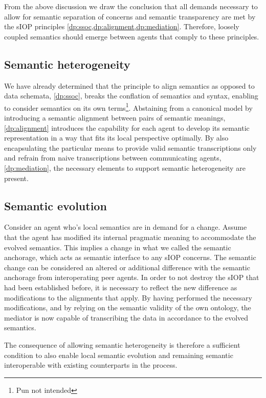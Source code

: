 \documentclass[sort&compress,preprint,authoryear,3p,twocolumn]{elsarticle}
\begin{document}
From the above discussion we draw the conclusion that all demands
necessary to allow for semantic separation of concerns and semantic
transparency are met by the sIOP principles
\cref{dp:ssoc,dp:alignment,dp:mediation}. Therefore, loosely coupled
semantics should emerge between agents that comply to these principles.

\hypertarget{semantic-heterogeneity}{%
\subsection{Semantic heterogeneity}\label{semantic-heterogeneity}}

We have already determined that the principle to align semantics as
opposed to data schemata, \cref{dp:ssoc}, breaks the conflation of
semantics and syntax, enabling to consider semantics on its own
terms\footnote{Pun not intended}. Abstaining from a canonical model by
introducing a semantic alignment between pairs of semantic meanings,
\cref{dp:alignment} introduces the capability for each agent to develop
its semantic representation in a way that fits its local perspective
optimally. By also encapsulating the particular means to provide valid
semantic transcriptions only and refrain from naive transcriptions
between communicating agents, \cref{dp:mediation}, the necessary
elements to support semantic heterogeneity are present.

\hypertarget{semantic-evolution}{%
\subsection{Semantic evolution}\label{semantic-evolution}}

Consider an agent who's local semantics are in demand for a change.
Assume that the agent has modified its internal pragmatic meaning to
accommodate the evolved semantics. This implies a change in what we
called the semantic anchorage, which acts as semantic interface to any
sIOP concerns. The semantic change can be considered an altered or
additional difference with the semantic anchorage from interoperating
peer agents. In order to not destroy the sIOP that had been established
before, it is necessary to reflect the new difference as modifications
to the alignments that apply. By having performed the necessary
modifications, and by relying on the semantic validity of the own
ontology, the mediator is now capable of transcribing the data in
accordance to the evolved semantics.

The consequence of allowing semantic heterogeneity is therefore a
sufficient condition to also enable local semantic evolution and
remaining semantic interoperable with existing counterparts in the
process.
\end{document}
